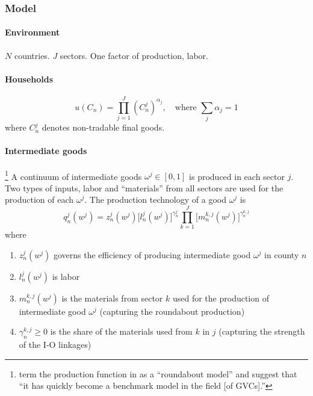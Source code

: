 \subsubsection{Model}
\paragraph{Environment}
$N$ countries.
$J$ sectors.
One factor of production, labor.

\paragraph{Households}
\begin{equation}
    u(C_n) = \prod_{j=1}^J \left(C_n^j \right)^{\alpha_j}, \quad \text{where } \sum_{j} \alpha_j = 1
\end{equation}
where $C_n^j$ denotes non-tradable final goods.

\paragraph{Intermediate goods}%
\footnote{
    \cite{Antras:2022} term the production function in \cite{Caliendo:2015} as a ``roundabout model''
    and suggest that ``it has quickly become a benchmark model in the field [of GVCs].''
}
A continuum of intermediate goods $\omega^j \in [0, 1]$ is produced in each sector $j$.
Two types of inputs, labor and ``materials'' from all sectors are used for the 
production of each $\omega^j$.
The production technology of a good $\omega^j$ is 
\begin{equation}
    q_n^j(w^j) = z_n^j(w^j)\bigg[ l_n^j(w^j) \bigg]^{\gamma_n^j} \prod_{k=1}^J \bigg[ m_n^{k,j}(w^j) \bigg]^{\gamma_n^{k,j}}
\end{equation}
where
\begin{enumerate}
    \item $z_n^j(w^j)$ governs the efficiency of producing intermediate good $\omega^j$ in county $n$
    \item $l_n^j(w^j)$ is labor
    \item $m_n^{k,j}(w^j)$ is the materials from sector $k$ used for the production of intermediate good $\omega^j$ (capturing the roundabout production)
    \item $\gamma_n^{k,j} \geq 0$ is the share of the materials used from $k$ in $j$ (capturing the strength of the I-O linkages)
\end{enumerate}